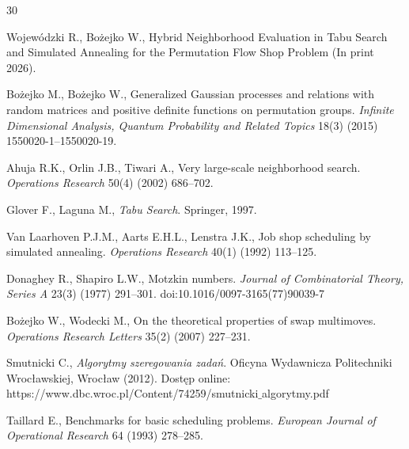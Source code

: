 

\begin{thebibliography}{30}

Wojewódzki R., Bożejko W., Hybrid Neighborhood Evaluation in Tabu Search and Simulated Annealing for the Permutation Flow Shop Problem (In print 2026).

Bożejko M., Bożejko W., Generalized Gaussian processes and relations with random matrices and positive definite functions on permutation groups. \emph{Infinite Dimensional Analysis, Quantum Probability and Related Topics} 18(3) (2015) 1550020-1--1550020-19.

Ahuja R.K., Orlin J.B., Tiwari A., Very large-scale neighborhood search. \emph{Operations Research} 50(4) (2002) 686--702.

Glover F., Laguna M., \emph{Tabu Search}. Springer, 1997.

Van Laarhoven P.J.M., Aarts E.H.L., Lenstra J.K., Job shop scheduling by simulated annealing. \emph{Operations Research} 40(1) (1992) 113--125.

Donaghey R., Shapiro L.W., Motzkin numbers.
\emph{Journal of Combinatorial Theory, Series A} 23(3) (1977) 291–301. doi:10.1016/0097-3165(77)90039-7

Bożejko W., Wodecki M., On the theoretical properties of swap multimoves. \emph{Operations Research Letters} 35(2) (2007) 227--231.


Smutnicki C., \emph{Algorytmy szeregowania zadań}. Oficyna Wydawnicza Politechniki Wrocławskiej, Wrocław (2012). Dostęp online: https://www.dbc.wroc.pl/Content/74259/smutnicki$\_$algorytmy.pdf

Taillard E., Benchmarks for basic scheduling problems. \emph{European Journal of Operational Research} 64 (1993) 278--285.


\end{thebibliography}
